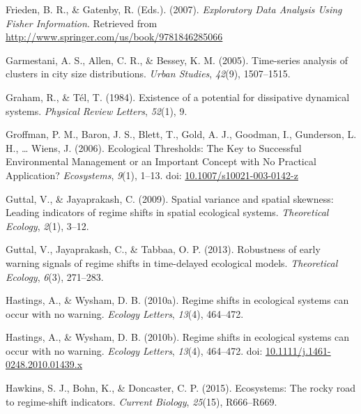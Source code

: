 \documentclass[12pt,twoside,openany]{reedthesis}
\begin{document}
\leavevmode\hypertarget{ref-frieden_exploratory_2007}{}%
Frieden, B. R., \& Gatenby, R. (Eds.). (2007). \emph{Exploratory Data Analysis Using Fisher Information}. Retrieved from \url{http://www.springer.com/us/book/9781846285066}

\leavevmode\hypertarget{ref-garmestani2005time}{}%
Garmestani, A. S., Allen, C. R., \& Bessey, K. M. (2005). Time-series analysis of clusters in city size distributions. \emph{Urban Studies}, \emph{42}(9), 1507--1515.

\leavevmode\hypertarget{ref-graham1984existence}{}%
Graham, R., \& Tél, T. (1984). Existence of a potential for dissipative dynamical systems. \emph{Physical Review Letters}, \emph{52}(1), 9.

\leavevmode\hypertarget{ref-groffman_ecological_2006}{}%
Groffman, P. M., Baron, J. S., Blett, T., Gold, A. J., Goodman, I., Gunderson, L. H., \ldots{} Wiens, J. (2006). Ecological Thresholds: The Key to Successful Environmental Management or an Important Concept with No Practical Application? \emph{Ecosystems}, \emph{9}(1), 1--13. doi: \href{https://doi.org/10.1007/s10021-003-0142-z}{10.1007/s10021-003-0142-z}

\leavevmode\hypertarget{ref-guttal2009spatial}{}%
Guttal, V., \& Jayaprakash, C. (2009). Spatial variance and spatial skewness: Leading indicators of regime shifts in spatial ecological systems. \emph{Theoretical Ecology}, \emph{2}(1), 3--12.

\leavevmode\hypertarget{ref-guttal2013robustness}{}%
Guttal, V., Jayaprakash, C., \& Tabbaa, O. P. (2013). Robustness of early warning signals of regime shifts in time-delayed ecological models. \emph{Theoretical Ecology}, \emph{6}(3), 271--283.

\leavevmode\hypertarget{ref-hastings2010regime}{}%
Hastings, A., \& Wysham, D. B. (2010a). Regime shifts in ecological systems can occur with no warning. \emph{Ecology Letters}, \emph{13}(4), 464--472.

\leavevmode\hypertarget{ref-hastings_regime_2010}{}%
Hastings, A., \& Wysham, D. B. (2010b). Regime shifts in ecological systems can occur with no warning. \emph{Ecology Letters}, \emph{13}(4), 464--472. doi: \href{https://doi.org/10.1111/j.1461-0248.2010.01439.x}{10.1111/j.1461-0248.2010.01439.x}

\leavevmode\hypertarget{ref-hawkins2015ecosystems}{}%
Hawkins, S. J., Bohn, K., \& Doncaster, C. P. (2015). Ecosystems: The rocky road to regime-shift indicators. \emph{Current Biology}, \emph{25}(15), R666--R669.
\end{document}
